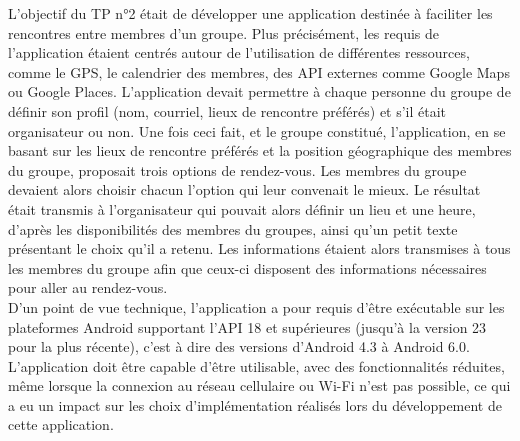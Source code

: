 L'objectif du TP n°2 était de développer une application destinée à faciliter les rencontres entre membres d'un groupe. Plus précisément, les requis de l'application étaient centrés autour de l'utilisation de différentes ressources, comme le GPS, le calendrier des membres, des API externes comme Google Maps ou Google Places. L'application devait permettre à chaque personne du groupe de définir son profil (nom, courriel, lieux de rencontre préférés) et s'il était organisateur ou non. Une fois ceci fait, et le groupe constitué, l'application, en se basant sur les lieux de rencontre préférés et la position géographique des membres du groupe, proposait trois options de rendez-vous. Les membres du groupe devaient alors choisir chacun l'option qui leur convenait le mieux. Le résultat était transmis à l'organisateur qui pouvait alors définir un lieu et une heure, d'après les disponibilités des membres du groupes, ainsi qu'un petit texte présentant le choix qu'il a retenu. Les informations étaient alors transmises à tous les membres du groupe afin que ceux-ci disposent des informations nécessaires pour aller au rendez-vous.\\
D'un point de vue technique, l'application a pour requis d'être exécutable sur les plateformes Android supportant l'API 18 et supérieures (jusqu'à la version 23 pour la plus récente), c'est à dire des versions d'Android 4.3 à Android 6.0. L'application doit être capable d'être utilisable, avec des fonctionnalités réduites, même lorsque la connexion au réseau cellulaire ou Wi-Fi n'est pas possible, ce qui a eu un impact sur les choix d'implémentation réalisés lors du développement de cette application.  

